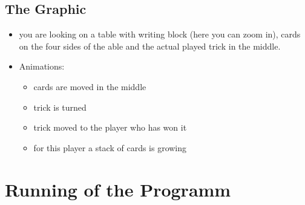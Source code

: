 \documentclass[12pt,a4paper]{article}
\begin{document}
\subsection{The Graphic}
\begin{itemize}
\item you are looking on a table with writing block (here you can zoom in), cards on the four sides of
the able and the actual played trick in the middle.
\item Animations:
\begin{itemize}
\item cards are moved in the middle
\item trick is turned
\item trick moved to the player who has won it
\item for this player a stack of cards is growing
\end{itemize}
\end{itemize}
\newpage
\section{Running of the Programm}
\end{document}
